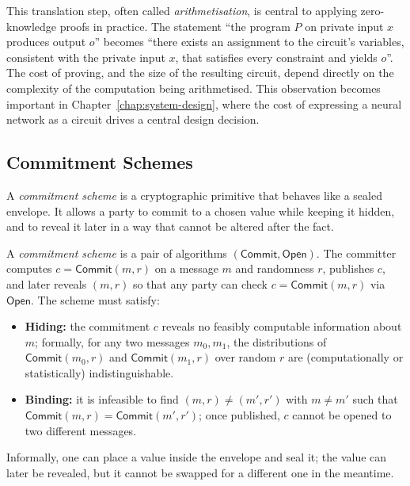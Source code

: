 \medskip

This translation step, often called \emph{arithmetisation}, is central to applying zero-knowledge proofs in practice. The statement ``the program $P$ on private input $x$ produces output $o$'' becomes ``there exists an assignment to the circuit's variables, consistent with the private input $x$, that satisfies every constraint and yields $o$''. The cost of proving, and the size of the resulting circuit, depend directly on the complexity of the computation being arithmetised. This observation becomes important in Chapter~\ref{chap:system-design}, where the cost of expressing a neural network as a circuit drives a central design decision.

\subsection{Commitment Schemes}
\label{subsec:bg-commitments}

A \emph{commitment scheme} is a cryptographic primitive that behaves like a sealed envelope. It allows a party to commit to a chosen value while keeping it hidden, and to reveal it later in a way that cannot be altered after the fact.

\begin{definition}
\label{def:commitment}
A \emph{commitment scheme} is a pair of algorithms $(\mathsf{Commit}, \mathsf{Open})$. The committer computes $c = \mathsf{Commit}(m, r)$ on a message $m$ and randomness $r$, publishes $c$, and later reveals $(m, r)$ so that any party can check $c = \mathsf{Commit}(m, r)$ via $\mathsf{Open}$. The scheme must satisfy:
\begin{itemize}
    \item \textbf{Hiding:} the commitment $c$ reveals no feasibly computable information about $m$; formally, for any two messages $m_0, m_1$, the distributions of $\mathsf{Commit}(m_0, r)$ and $\mathsf{Commit}(m_1, r)$ over random $r$ are (computationally or statistically) indistinguishable.
    \item \textbf{Binding:} it is infeasible to find $(m, r) \neq (m', r')$ with $m \neq m'$ such that $\mathsf{Commit}(m, r) = \mathsf{Commit}(m', r')$; once published, $c$ cannot be opened to two different messages.
\end{itemize}
\end{definition}

Informally, one can place a value inside the envelope and seal it; the value can later be revealed, but it cannot be swapped for a different one in the meantime.

